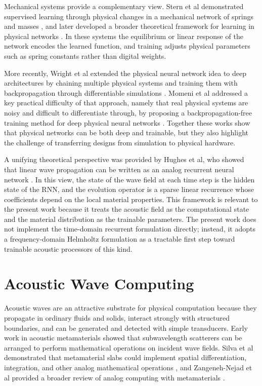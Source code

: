 Mechanical systems provide a complementary view. Stern et al demonstrated supervised learning through physical changes in a mechanical network of springs and masses \cite{stern2020supervised}, and later developed a broader theoretical framework for learning in physical networks \cite{stern2021physical}. In these systems the equilibrium or linear response of the network encodes the learned function, and training adjusts physical parameters such as spring constants rather than digital weights.

More recently, Wright et al extended the physical neural network idea to deep architectures by chaining multiple physical systems and training them with backpropagation through differentiable simulations \cite{wright2022deep}. Momeni et al addressed a key practical difficulty of that approach, namely that real physical systems are noisy and difficult to differentiate through, by proposing a backpropagation-free training method for deep physical neural networks \cite{momeni2023backpropagation}. Together these works show that physical networks can be both deep and trainable, but they also highlight the challenge of transferring designs from simulation to physical hardware.

A unifying theoretical perspective was provided by Hughes et al, who showed that linear wave propagation can be written as an analog recurrent neural network \cite{hughes2019wave}. In this view, the state of the wave field at each time step is the hidden state of the RNN, and the evolution operator is a sparse linear recurrence whose coefficients depend on the local material properties. This framework is relevant to the present work because it treats the acoustic field as the computational state and the material distribution as the trainable parameters. The present work does not implement the time-domain recurrent formulation directly; instead, it adopts a frequency-domain Helmholtz formulation as a tractable first step toward trainable acoustic processors of this kind.

\section{Acoustic Wave Computing}
\label{sec:lit_acoustic}

Acoustic waves are an attractive substrate for physical computation because they propagate in ordinary fluids and solids, interact strongly with structured boundaries, and can be generated and detected with simple transducers. Early work in acoustic metamaterials showed that subwavelength scatterers can be arranged to perform mathematical operations on incident wave fields. Silva et al demonstrated that metamaterial slabs could implement spatial differentiation, integration, and other analog mathematical operations \cite{silva2014mathematical}, and Zangeneh-Nejad et al provided a broader review of analog computing with metamaterials \cite{zangenehnejad2021analogue}.

